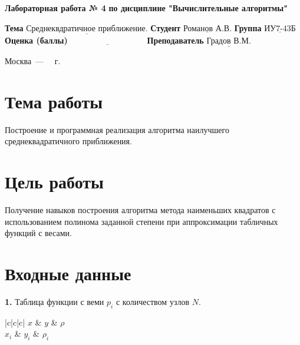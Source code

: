 \documentclass[a4paper,12pt]{article}
\begin{document}
\begin{center}
	\noindent\begin{minipage}{1.3\textwidth}\centering
	\Large\textbf{  Лабораторная работа № 4}\newline
	\textbf{по дисциплине "Вычислительные алгоритмы"}\newline\newline\newline
	\end{minipage}
\end{center}

\noindent\textbf{Тема} $\underline{\text{Среднеквдратичное приближение.}}$\newline\newline
\noindent\textbf{Студент} $\underline{\text{Романов А.В.}}$\newline\newline
\noindent\textbf{Группа} $\underline{\text{ИУ7-43Б}}$\newline\newline
\noindent\textbf{Оценка (баллы)} $\underline{\text{~~~~~~~~~~~~~~~~~~~~~~~~~~~}}$\newline\newline
\noindent\textbf{Преподаватель} $\underline{\text{Градов В.М.}}$\newline
	
\begin{center}
	\vfill
	Москва~---~\the\year
~г.
\end{center}
\clearpage
\section{Тема работы}

\textbf{}Построение и программная реализация алгоритма наилучшего среднеквадратичного приближения.
\section{Цель работы}

\textbf{}Получение навыков построения алгоритма метода наименьших квадратов с использованием полинома заданной степени при аппроксимации табличных функций с весами.
\section{Входные данные}

\noindent\textbf{1.} Таблица функции с веми $p_{i}$ с количеством узлов $N$.
\begin{center}
	\begin{tabular}{ |c|c|c| } 
		\hline
		$x$ & $y$ & $\rho$ \\
		\hline
		 {$x_{i}$} & $   {y_{i}}$  & $\rho_{i}$  \\ 
		\hline
	\end{tabular}
\end{center}
\end{document}
